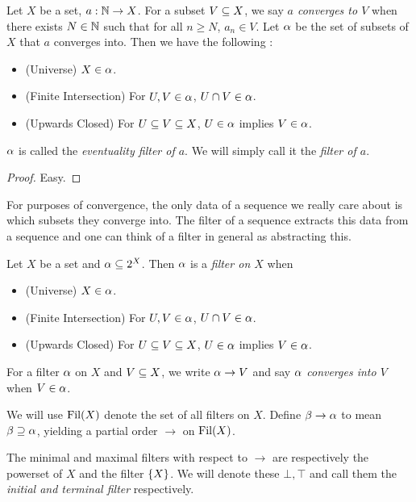 \documentclass[main.tex]{subfiles}
\begin{document}
\begin{prop}
  
  Let $X$ be a set, $a : \mathbb{N} \to X$. 
  For a subset $V \subseteq X$,
  we say \emph{$a$ converges to $V$} when
  there exists $N \in \mathbb{N}$ such that 
  for all $n \geq N$, $a_n \in V$.
  Let $\alpha$ be the set of subsets of $X$ that $a$ converges into. 
  Then we have the following : 
  \begin{itemize}
    \item (Universe) $X \in \alpha$.
    \item (Finite Intersection) For $U, V \in \alpha$, $U \cap V \in \alpha$.
    \item (Upwards Closed) For $U \subseteq V \subseteq X$, 
    $U \in \alpha$ implies $V \in \alpha$.
  \end{itemize}
  $\alpha$ is called the \emph{eventuality filter of $a$}.
  We will simply call it the \emph{filter of $a$}.
\end{prop}
\begin{proof}
  Easy.
\end{proof}

\begin{rmk}
  For purposes of convergence, 
  the only data of a sequence we really care about is 
  which subsets they converge into. 
  The filter of a sequence extracts this data from a sequence and 
  one can think of a filter in general as abstracting this.
\end{rmk}

\begin{dfn}[Filter] 

  Let $X$ be a set and $\alpha \subseteq 2^X$. 
  Then $\alpha$ is a \emph{filter on $X$} when 
  \begin{itemize}
    \item (Universe) $X \in \alpha$.
    \item (Finite Intersection) For $U, V \in \alpha$, $U \cap V \in \alpha$.
    \item (Upwards Closed) For $U \subseteq V \subseteq X$, 
    $U \in \alpha$ implies $V \in \alpha$.
  \end{itemize}

  For a filter $\alpha$ on $X$ and $V \subseteq X$,
  we write $\alpha \to V$ and say \emph{$\alpha$ converges into $V$} 
  when $V \in \alpha$.

  We will use $\operatorname{Fil}(X)$ denote the set of all filters on $X$.
  Define $\beta \to \alpha$ to mean $\beta \supseteq \alpha$,
  yielding a partial order $\to$ on $\operatorname{Fil}(X)$.

  The minimal and maximal filters with respect to $\to$ are respectively 
  the powerset of $X$ and the filter $\left\{X\right\}$.
  We will denote these $\bot, \top$ and call them 
  the \emph{initial and terminal filter} respectively.
  
\end{dfn} 
\end{document}
